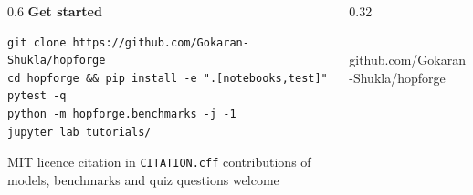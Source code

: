 \documentclass[aspectratio=169,11pt]{beamer}
\begin{document}
{
\begin{frame}
\begin{columns}[c]
\begin{column}{0.6\textwidth}
{\Huge\bfseries Get started}\\[14pt]
\begin{lstlisting}[backgroundcolor=\color{white!95!navy},basicstyle=\ttfamily\scriptsize\color{navy}]
git clone https://github.com/Gokaran-Shukla/hopforge
cd hopforge && pip install -e ".[notebooks,test]"
pytest -q
python -m hopforge.benchmarks -j -1
jupyter lab tutorials/
\end{lstlisting}
\vspace{10pt}
{\small\color{white!80}MIT licence \textbullet{} citation in \texttt{CITATION.cff} \textbullet{} contributions of models, benchmarks and quiz questions welcome}
\end{column}
\begin{column}{0.32\textwidth}
\centering
{}\\[6pt]
{\small github.com/Gokaran-Shukla/hopforge}
\end{column}
\end{columns}
\end{frame}
}
\end{document}
